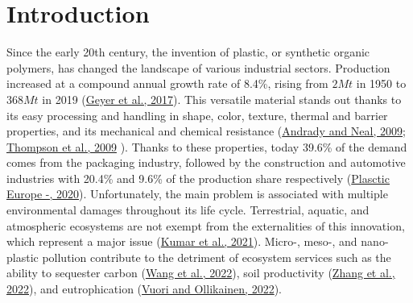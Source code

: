 \documentclass[12pt]{elsarticle} %
\begin{document}
\hypertarget{introduction}{%
\section{Introduction}\label{introduction}}

\linenumbers

Since the early 20th century, the invention of plastic, or synthetic organic polymers, has changed the landscape of various industrial sectors.
Production increased at a compound annual growth rate of 8.4\%, rising from \(2Mt\) in 1950 to \(368Mt\) in 2019 (\protect\hyperlink{ref-Geyer2017}{Geyer et al., 2017}).
This versatile material stands out thanks to its easy processing and handling in shape, color, texture, thermal and barrier properties, and its mechanical and chemical resistance (\protect\hyperlink{ref-Andrady2009}{Andrady and Neal, 2009}; \protect\hyperlink{ref-Thompson2009a}{Thompson et al., 2009} ).
Thanks to these properties, today 39.6\% of the demand comes from the packaging industry, followed by the construction and automotive industries with 20.4\% and 9.6\% of the production share respectively (\protect\hyperlink{ref-PlascticEurope2020}{Plasctic Europe -, 2020}).
Unfortunately, the main problem is associated with multiple environmental damages throughout its life cycle.
Terrestrial, aquatic, and atmospheric ecosystems are not exempt from the externalities of this innovation, which represent a major issue (\protect\hyperlink{ref-Kumar2021}{Kumar et al., 2021}).
Micro-, meso-, and nano-plastic pollution contribute to the detriment of ecosystem services such as the ability to sequester carbon (\protect\hyperlink{ref-wang2022a}{Wang et al., 2022}), soil productivity (\protect\hyperlink{ref-zhang2022b}{Zhang et al., 2022}), and eutrophication (\protect\hyperlink{ref-vuori2022}{Vuori and Ollikainen, 2022}).
\end{document}
